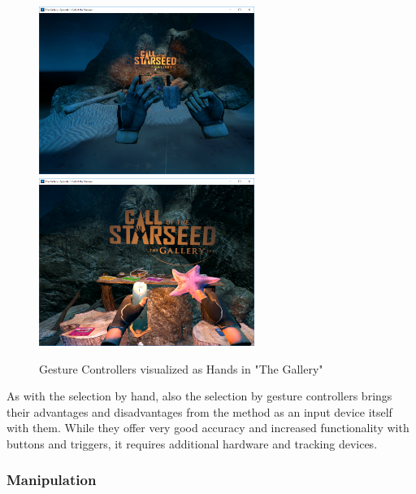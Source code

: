 \begin{figure}[h]
	\begin{center}
		\includegraphics[width=7cm]{03_Figures/05_LitReview/Cloudhead2016_TheGallery.png}
		\includegraphics[width=7cm]{03_Figures/05_LitReview/Cloudhead2016_TheGallery3.png}
		\caption[Gesture Controllers visualized as Hands in "The Gallery"]{Gesture Controllers visualized as Hands in "The Gallery" \citep{CloudheadGames2016}}
		\label{fig:theGalleryHands}
	\end{center}
\end{figure} \newline
As with the selection by hand, also the selection by gesture controllers brings their advantages and disadvantages from the method as an input device itself with them. While they offer very good accuracy and increased functionality with buttons and triggers, it requires additional hardware and tracking devices.



\subsubsection{Manipulation}

